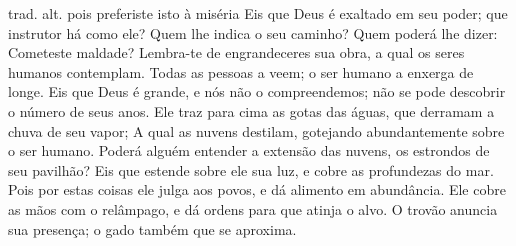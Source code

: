 {{trad. alt. pois preferiste isto à miséria
}
  Eis que Deus é exaltado em seu poder; que instrutor há como ele?
  Quem lhe indica o seu caminho? Quem poderá lhe dizer: Cometeste maldade?
  Lembra-te de engrandeceres sua obra, a qual os seres humanos contemplam.
  Todas as pessoas a veem; o ser humano a enxerga de longe.
  Eis que Deus é grande, e nós não o compreendemos; não se pode descobrir o número de seus anos.
  Ele traz para cima as gotas das águas, que derramam a chuva de seu vapor;
  A qual as nuvens destilam, gotejando abundantemente sobre o ser humano.
  Poderá alguém entender a extensão das nuvens,
{} os estrondos de seu pavilhão?
  Eis que estende sobre ele sua luz, e cobre as profundezas
 do mar.
  Pois por estas coisas ele julga aos povos, e dá alimento em abundância.
  Ele cobre as mãos com o relâmpago, e dá ordens para que atinja o alvo.
  O trovão anuncia sua presença; o gado também
{} que se aproxima.
\par }

